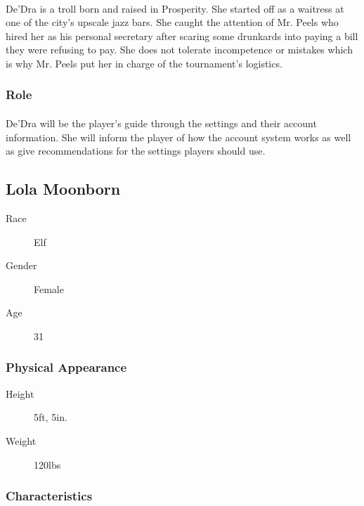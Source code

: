 \paragraph{} De'Dra is a troll born and raised in Prosperity. She started off as a waitress at one of the city's upscale jazz bars. She caught the attention of Mr. Peels who hired her as his personal secretary after scaring some drunkards into paying a bill they were refusing to pay. She does not tolerate incompetence or mistakes which is why Mr. Peels put her in charge of the tournament's logistics.

\subsubsection{Role}

\paragraph{} De'Dra will be the player's guide through the settings and their account information. She will inform the player of how the account system works as well as give recommendations for the settings players should use.

\pagebreak

\subsection{Lola Moonborn}

\begin{description}
    \item[Race] Elf
    \item[Gender] Female
    \item[Age] 31  
\end{description}

\subsubsection{Physical Appearance}

\begin{description}
    \item[Height] 5ft, 5in.
    \item[Weight] 120lbs
\end{description}

\subsubsection{Characteristics}

